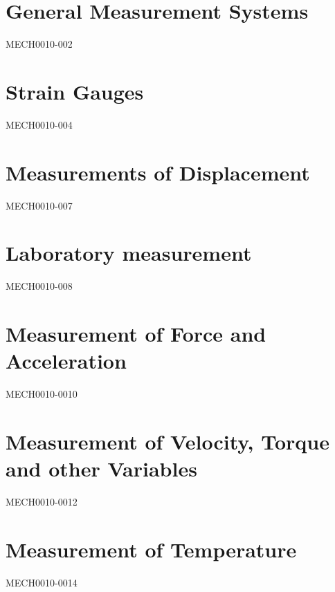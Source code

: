 \documentclass[12pt,a4paper, twoside]{report}
\begin{document}
\chapter{General Measurement Systems}
{MECH0010-002}
\chapter{Strain Gauges}
{MECH0010-004}
\chapter{Measurements of Displacement}
{MECH0010-007}
\chapter{Laboratory measurement}
{MECH0010-008}
\chapter{Measurement of Force and Acceleration}
{MECH0010-0010}
\chapter{Measurement of Velocity, Torque and other Variables}
{MECH0010-0012}
\chapter{Measurement of Temperature}
{MECH0010-0014}
\end{document}
